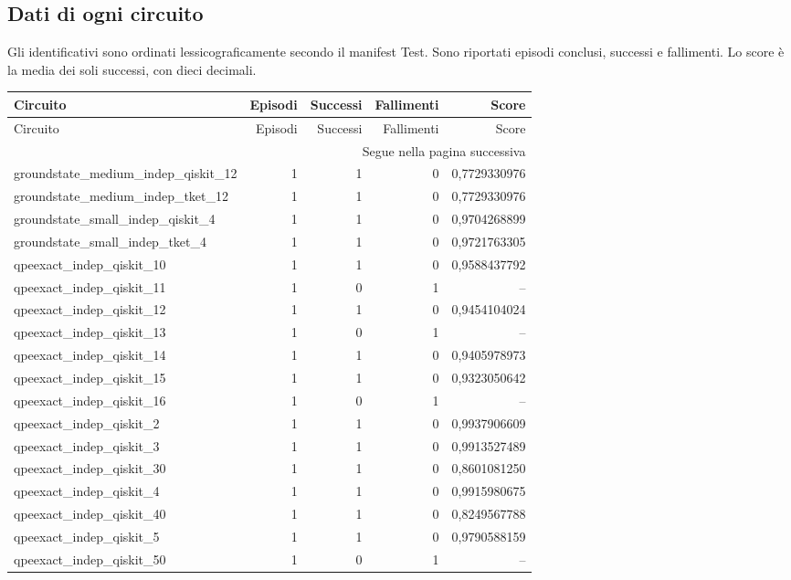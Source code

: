 \subsection{Dati di ogni circuito}
Gli identificativi sono ordinati lessicograficamente secondo il manifest Test. Sono riportati episodi conclusi, successi e fallimenti. Lo score è la media dei soli successi, con dieci decimali.
\begingroup\scriptsize
\setlength{\tabcolsep}{5pt}
\begin{longtable}{lrrrr}
\toprule
Circuito & Episodi & Successi & Fallimenti & Score \\
\midrule
\endfirsthead
\toprule
Circuito & Episodi & Successi & Fallimenti & Score \\
\midrule\endhead
\midrule\multicolumn{5}{r}{\footnotesize Segue nella pagina successiva}\\
\endfoot
\bottomrule\endlastfoot
groundstate\_medium\_indep\_qiskit\_12 & 1 & 1 & 0 & 0,7729330976 \\
groundstate\_medium\_indep\_tket\_12 & 1 & 1 & 0 & 0,7729330976 \\
groundstate\_small\_indep\_qiskit\_4 & 1 & 1 & 0 & 0,9704268899 \\
groundstate\_small\_indep\_tket\_4 & 1 & 1 & 0 & 0,9721763305 \\
qpeexact\_indep\_qiskit\_10 & 1 & 1 & 0 & 0,9588437792 \\
qpeexact\_indep\_qiskit\_11 & 1 & 0 & 1 & -- \\
qpeexact\_indep\_qiskit\_12 & 1 & 1 & 0 & 0,9454104024 \\
qpeexact\_indep\_qiskit\_13 & 1 & 0 & 1 & -- \\
qpeexact\_indep\_qiskit\_14 & 1 & 1 & 0 & 0,9405978973 \\
qpeexact\_indep\_qiskit\_15 & 1 & 1 & 0 & 0,9323050642 \\
qpeexact\_indep\_qiskit\_16 & 1 & 0 & 1 & -- \\
qpeexact\_indep\_qiskit\_2 & 1 & 1 & 0 & 0,9937906609 \\
qpeexact\_indep\_qiskit\_3 & 1 & 1 & 0 & 0,9913527489 \\
qpeexact\_indep\_qiskit\_30 & 1 & 1 & 0 & 0,8601081250 \\
qpeexact\_indep\_qiskit\_4 & 1 & 1 & 0 & 0,9915980675 \\
qpeexact\_indep\_qiskit\_40 & 1 & 1 & 0 & 0,8249567788 \\
qpeexact\_indep\_qiskit\_5 & 1 & 1 & 0 & 0,9790588159 \\
qpeexact\_indep\_qiskit\_50 & 1 & 0 & 1 & -- \\

\end{longtable}
